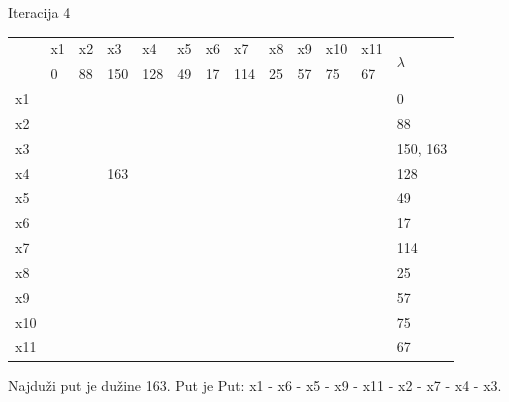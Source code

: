 \documentclass[12pt]{article}
\begin{document}
Iteracija 4
\begin{table}[hp]
\centering
\begin{tabular}{|l|l|l|l|l|l|l|l|l|l|l|l|l|}
\hline
\multirow{2}{*}{} & x1 & x2 & x3 & x4 & x5 & x6 & x7 & x8 & x9 & x10 & x11 & \multirow{2}{*}{$\lambda$} \\ \cline{2-12}
 & 0 & 88 & 150 & 128 & 49 & 17 & 114 & 25 & 57 & 75 & 67 &  \\ \hline
x1 &  &  &  &  &  &  &  &  &  &  &  & 0 \\ \hline
x2 &  &  &  &  &  &  &  &  &  &  &  & 88 \\ \hline
x3 &  &  &  &  &  &  &  &  &  &  &  & 150, 163 \\ \hline
x4 &  &  & 163 &  &  &  &  &  &  &  &  & 128 \\ \hline
x5 &  &  &  &  &  &  &  &  &  &  &  & 49 \\ \hline
x6 &  &  &  &  &  &  &  &  &  &  &  & 17 \\ \hline
x7 &  &  &  &  &  &  &  &  &  &  &  & 114 \\ \hline
x8 &  &  &  &  &  &  &  &  &  &  &  & 25 \\ \hline
x9 &  &  &  &  &  &  &  &  &  &  &  & 57 \\ \hline
x10 &  &  &  &  &  &  &  &  &  &  &  & 75 \\ \hline
x11 &  &  &  &  &  &  &  &  &  &  &  & 67 \\ \hline
\end{tabular}
\end{table}

Najduži put je dužine 163. Put je Put: x1 - x6 - x5 - x9 - x11 - x2 - x7 - x4 - x3.
\end{document}
